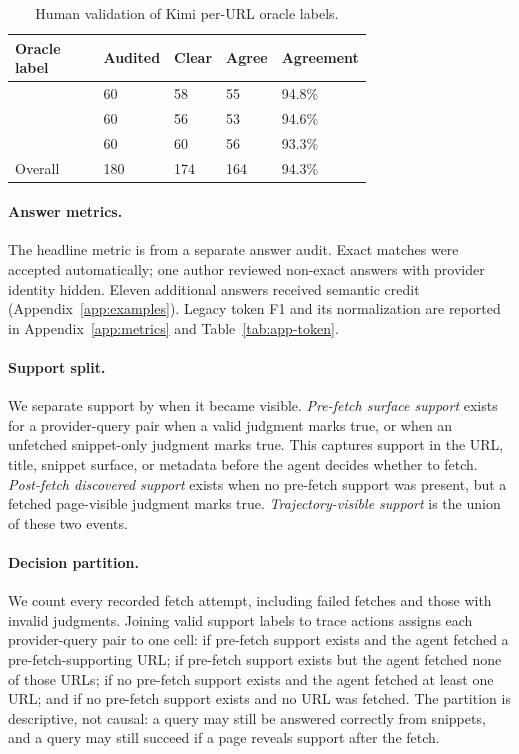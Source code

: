 \begin{table}[!t]
\centering
\scriptsize
\setlength{\tabcolsep}{2pt}
\begin{tabularx}{\linewidth}{@{}L{0.40\linewidth}R{0.11\linewidth}R{0.10\linewidth}R{0.10\linewidth}Y@{}}
\toprule
\textbf{Oracle label} & \textbf{Audited} & \textbf{Clear} & \textbf{Agree} & \textbf{Agreement} \\
\midrule
{} & 60 & 58 & 55 & 94.8\% \\
 & 60 & 56 & 53 & 94.6\% \\
 & 60 & 60 & 56 & 93.3\% \\
\midrule
Overall & 180 & 174 & 164 & 94.3\% \\
\bottomrule
\end{tabularx}
\caption{Human validation of Kimi per-URL oracle labels.}
\label{tab:judge-validation}
\end{table}

\paragraph{Answer metrics.}
The headline \correctans{} metric is \semanticMatch{} from a separate answer audit. Exact matches were accepted automatically; one author reviewed non-exact answers with provider identity hidden. Eleven additional answers received semantic credit (Appendix~\ref{app:examples}). Legacy token F1 and its normalization are reported in Appendix~\ref{app:metrics} and Table~\ref{tab:app-token}.

\paragraph{Support split.}
We separate support by when it became visible. \emph{Pre-fetch surface support} exists for a provider-query pair when a valid judgment marks \goldSnip{} true, or when an unfetched snippet-only judgment marks \containsGold{} true. This captures support in the URL, title, snippet surface, or metadata before the agent decides whether to fetch. \emph{Post-fetch discovered support} exists when no pre-fetch support was present, but a fetched page-visible judgment marks \goldPage{} true. \emph{Trajectory-visible support} is the union of these two events.

\paragraph{Decision partition.}
We count every recorded fetch attempt, including failed fetches and those with invalid judgments. Joining valid support labels to trace actions assigns each provider-query pair to one cell: \smart{} if pre-fetch support exists and the agent fetched a pre-fetch-supporting URL; \missed{} if pre-fetch support exists but the agent fetched none of those URLs; \blind{} if no pre-fetch support exists and the agent fetched at least one URL; and \noop{} if no pre-fetch support exists and no URL was fetched. The partition is descriptive, not causal: a \missed{} query may still be answered correctly from snippets, and a \blind{} query may still succeed if a page reveals support after the fetch.

